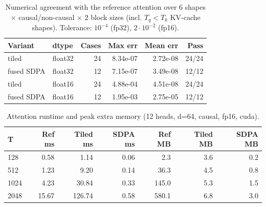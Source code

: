 \begin{table}[t]
\centering
\caption{Numerical agreement with the reference attention over 6 shapes $\times$ causal/non-causal $\times$ 2 block sizes (incl. $T_q<T_k$ KV-cache shapes). Tolerance: $10^{-4}$ (fp32), $2\cdot10^{-2}$ (fp16).}
\label{tab:attn-err}
\footnotesize
\begin{tabular}{llrrrr}
\toprule
Variant & dtype & Cases & Max err & Mean err & Pass \\
\midrule
tiled & float32 & 24 & 8.34e-07 & 2.72e-08 & 24/24 \\
fused SDPA & float32 & 12 & 7.15e-07 & 3.49e-08 & 12/12 \\
tiled & float16 & 24 & 4.88e-04 & 4.51e-08 & 24/24 \\
fused SDPA & float16 & 12 & 1.95e-03 & 2.75e-05 & 12/12 \\
\bottomrule
\end{tabular}
\end{table}

\begin{table}[t]
\centering
\caption{Attention runtime and peak extra memory (12 heads, d=64, causal, fp16, cuda).}
\label{tab:attn-perf}
\scriptsize
\setlength{\tabcolsep}{3pt}
\begin{tabular}{lrrrrrr}
\toprule
T & Ref ms & Tiled ms & SDPA ms & Ref MB & Tiled MB & SDPA MB \\
\midrule
128 & 0.58 & 1.14 & 0.06 & 2.3 & 3.6 & 0.2 \\
512 & 1.23 & 9.20 & 0.14 & 36.3 & 4.5 & 0.8 \\
1024 & 4.23 & 30.84 & 0.33 & 145.0 & 5.3 & 1.5 \\
2048 & 15.67 & 126.74 & 0.58 & 580.1 & 6.8 & 3.0 \\
\bottomrule
\end{tabular}
\end{table}
